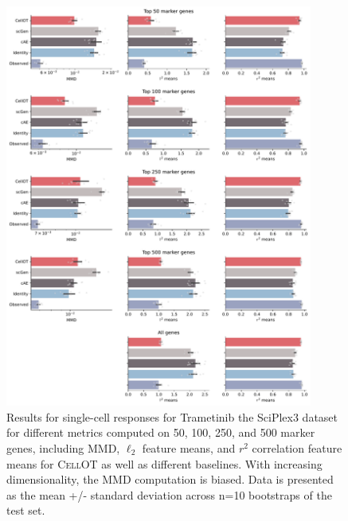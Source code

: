  \begin{figure}[H]
    \centering
    \includegraphics[width=0.9\textwidth]{figures/cellot-methods/Bunne_Supp_Fig7.pdf}
    \caption{Results for single-cell responses for Trametinib the SciPlex3 dataset for different metrics computed on 50, 100, 250, and 500 marker genes, including MMD, $\ell_2$ feature means, and $r^2$ correlation feature means for \textsc{CellOT} as well as different baselines. With increasing dimensionality, the MMD computation is biased. Data is presented as the mean +/- standard deviation across n=10 bootstraps of the test set.}
    \label{supp_fig:sciplex_num_markers}
\end{figure}

